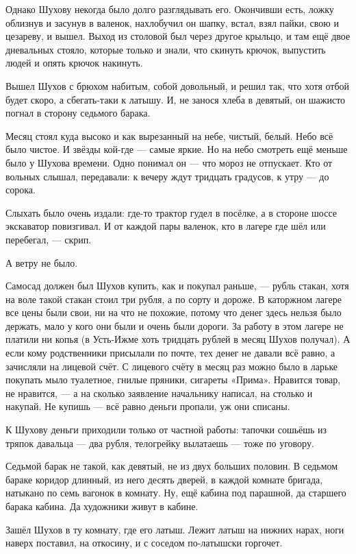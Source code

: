 Однако Шухову некогда было долго разглядывать его. Окончивши есть, ложку облизнув и засунув в валенок, нахлобучил он шапку, встал, взял пайки, свою и цезареву, и вышел. Выход из столовой был через другое крыльцо, и там ещё двое дневальных стояло, которые только и знали, что скинуть крючок, выпустить людей и опять крючок накинуть.

Вышел Шухов с брюхом набитым, собой довольный, и решил так, что хотя отбой будет скоро, а сбегать-таки к латышу. И, не занося хлеба в девятый, он шажисто погнал в сторону седьмого барака.

Месяц стоял куда высоко и как вырезанный на небе, чистый, белый. Небо всё было чистое. И звёзды кой-где --- самые яркие. Но на небо смотреть ещё меньше было у Шухова времени. Одно понимал он --- что мороз не отпускает. Кто от вольных слышал, передавали: к вечеру ждут тридцать градусов, к утру --- до сорока.

Слыхать было очень издали: где-то трактор гудел в посёлке, а в стороне шоссе экскаватор повизгивал. И от каждой пары валенок, кто в лагере где шёл или перебегал, --- скрип.

А ветру не было.

Самосад должен был Шухов купить, как и покупал раньше, --- рубль стакан, хотя на воле такой стакан стоил три рубля, а по сорту и дороже. В каторжном лагере все цены были свои, ни на что не похожие, потому что денег здесь нельзя было держать, мало у кого они были и очень были дороги. За работу в этом лагере не платили ни копья (в Усть-Ижме хоть тридцать рублей в месяц Шухов получал). А если кому родственники присылали по почте, тех денег не давали всё равно, а зачисляли на лицевой счёт. С лицевого счёту в месяц раз можно было в ларьке покупать мыло туалетное, гнилые пряники, сигареты «Прима». Нравится товар, не нравится, --- а на сколько заявление начальнику написал, на столько и накупай. Не купишь --- всё равно деньги пропали, уж они списаны.

К Шухову деньги приходили только от частной работы: тапочки сошьёшь из тряпок давальца --- два рубля, телогрейку вылатаешь --- тоже по уговору.

Седьмой барак не такой, как девятый, не из двух больших половин. В седьмом бараке коридор длинный, из него десять дверей, в каждой комнате бригада, натыкано по семь вагонок в комнату. Ну, ещё кабина под парашной, да старшего барака кабина. Да художники живут в кабине.

Зашёл Шухов в ту комнату, где его латыш. Лежит латыш на нижних нарах, ноги наверх поставил, на откосину, и с соседом по-латышски горгочет.

